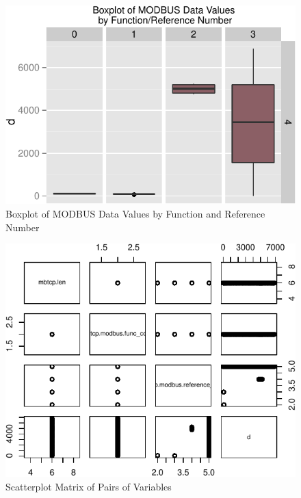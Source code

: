 \documentclass[12pt,]{article}
\begin{document}
\begin{figure}

{\centering \includegraphics{thesis_files/figure-latex/unnamed-chunk-34-1} 

}

\caption{Boxplot of MODBUS Data Values by Function and Reference Number}\label{fig:unnamed-chunk-34}
\end{figure}

\nopagebreak

\begin{figure}

{\centering \includegraphics{thesis_files/figure-latex/unnamed-chunk-35-1} 

}

\caption{Scatterplot Matrix of Pairs of Variables}\label{fig:unnamed-chunk-35}
\end{figure}
\end{document}
